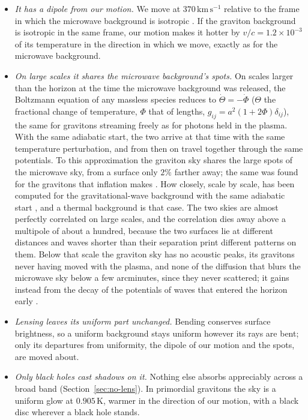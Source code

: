 \begin{itemize}
\item \emph{It has a dipole from our motion.} We move at $370\,\mathrm{km\,s^{-1}}$
relative to the frame in which the microwave background is isotropic
\cite{Planck2018I}. If the graviton background is isotropic in the same frame,
our motion makes it hotter by $v/c = 1.2\times10^{-3}$ of its temperature in
the direction in which we move, exactly as for the microwave background.
\item \emph{On large scales it shares the microwave background's spots.} On scales larger
than the horizon at the time the microwave background was released, the
Boltzmann equation of any massless species reduces to
$\dot\Theta = -\dot\Phi$ ($\Theta$ the fractional change of temperature, $\Phi$ that of lengths, $g_{ij} = a^2(1 + 2\Phi)\delta_{ij}$), the same for gravitons streaming freely as for
photons held in the plasma. With the same adiabatic start, the two arrive at
that time with the same temperature perturbation, and from then on travel
together through the same potentials. To this approximation the graviton sky
shares the large spots of the microwave sky, from a surface only $2\%$
farther away; the same was found for the gravitons that inflation makes
\cite{AlbaMaldacena2016}. How closely, scale by scale, has been computed for
the gravitational-wave background with the same adiabatic start
\cite{Bartolo2019,Ricciardone2021}, and a thermal background is that case.
The two skies are almost perfectly correlated on large scales, and the
correlation dies away above a multipole of about a hundred, because the two
surfaces lie at different distances and waves shorter than their separation
print different patterns on them. Below that scale the graviton sky has no
acoustic peaks, its gravitons never having moved with the plasma, and none of
the diffusion that blurs the microwave sky below a few arcminutes, since they
never scattered; it gains instead from the decay of the potentials of waves
that entered the horizon early \cite{Schulze2023}.
\item \emph{Lensing leaves its uniform part unchanged.} Bending conserves
surface brightness, so a uniform background stays uniform however its rays are
bent; only its departures from uniformity, the dipole of our motion and the
spots, are moved about.
\item \emph{Only black holes cast shadows on it.} Nothing else absorbs
appreciably across a broad band (Section~\ref{sec:no-lens}). In primordial gravitons the sky is a
uniform glow at $0.905\,\mathrm{K}$, warmer in the direction of our motion,
with a black disc wherever a black hole stands.
\end{itemize}

